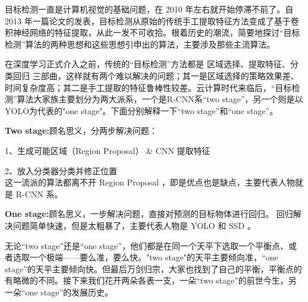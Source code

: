 目标检测一直是计算机视觉的基础问题，在 2010 年左右就开始停滞不前了。自 2013 年一篇论文的发表，目标检测从原始的传统手工提取特征方法变成了基于卷积神经网络的特征提取，从此一发不可收拾。根着历史的潮流，简要地探讨“目标检测”算法的两种思想和这些思想引申出的算法，主要涉及那些主流算法。

在深度学习正式介入之前，传统的“目标检测”方法都是 区域选择、提取特征、分类回归 三部曲，这样就有两个难以解决的问题；其一是区域选择的策略效果差、时间复杂度高；其二是手工提取的特征鲁棒性较差。云计算时代来临后，“目标检测”算法大家族主要划分为两大派系，一个是R-CNN系“two stage”，另一个则是以YOLO为代表的"one stage"。下面分别解释一下“two stage”和“one stage”。

\textbf{Two stage:}顾名思义，分两步解决问题：

1、生成可能区域（Region Proposal） \& CNN 提取特征 

2、放入分类器分类并修正位置 \\
这一流派的算法都离不开 Region Proposal ，即是优点也是缺点，主要代表人物就是 R-CNN 系。

\textbf{One stage:}顾名思义，一步解决问题，直接对预测的目标物体进行回归。
回归解决问题简单快速，但是太粗暴了，主要代表人物是 YOLO 和 SSD 。

无论“two stage”还是“one stage”，他们都是在同一个天平下选取一个平衡点、或者选取一个极端——要么准，要么快。"two stage"的天平主要倾向准，“one stage”的天平主要倾向快。但最后万剑归宗，大家也找到了自己的平衡，平衡点的有略微的不同。接下来我们花开两朵各表一支，一朵“two stage”的前世今生，另一朵“one stage”的发展历史。

